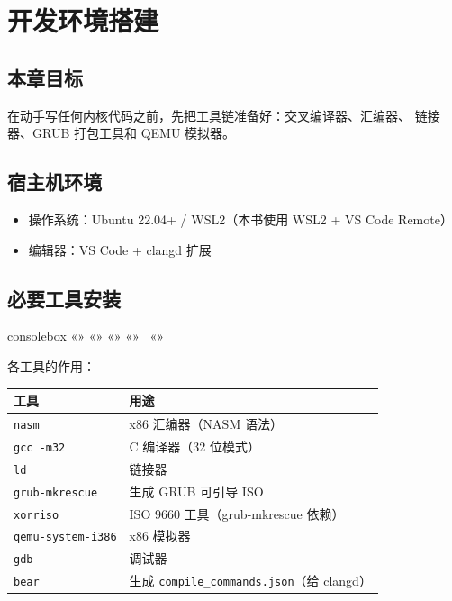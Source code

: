 \chapter{开发环境搭建}
\label{ch:environment}

\section{本章目标}

在动手写任何内核代码之前，先把工具链准备好：交叉编译器、汇编器、
链接器、GRUB 打包工具和 QEMU 模拟器。

\section{宿主机环境}

\begin{itemize}
  \item 操作系统：Ubuntu 22.04+ / WSL2（本书使用 WSL2 + VS Code Remote）
  \item 编辑器：VS Code + clangd 扩展
\end{itemize}

\section{必要工具安装}

\begin{tcblisting}{consolebox}
«\tps{\$}» «»
«\tps{\$}» «» \
    «»
\end{tcblisting}

各工具的作用：

\begin{longtable}{ll}
  \toprule
  \textbf{工具} & \textbf{用途} \\
  \midrule
  \texttt{nasm}           & x86 汇编器（NASM 语法） \\
  \texttt{gcc -m32}       & C 编译器（32 位模式） \\
  \texttt{ld}             & 链接器 \\
  \texttt{grub-mkrescue}  & 生成 GRUB 可引导 ISO \\
  \texttt{xorriso}        & ISO 9660 工具（grub-mkrescue 依赖） \\
  \texttt{qemu-system-i386} & x86 模拟器 \\
  \texttt{gdb}            & 调试器 \\
  \texttt{bear}           & 生成 \texttt{compile\_commands.json}（给 clangd） \\
  \bottomrule
\end{longtable}

